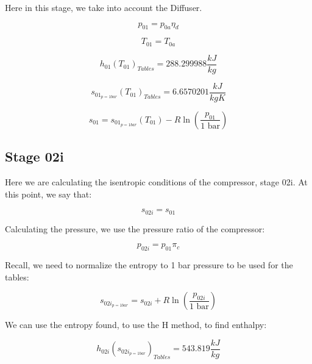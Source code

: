 \documentclass[titlepage]{article}
\begin{document}
    Here in this stage, we take into account the Diffuser. 

    \begin{equation} 
        p_{01} = p_{0a} \eta_{d}
    \end{equation}

    \begin{equation}
        T_{01} = T_{0a} 
    \end{equation}

    \begin{equation}
        h_{01}(T_{01})_{Tables} = 288.299988 \frac{kJ}{kg}
    \end{equation}

    \begin{equation}
        s_{01_{p= 1 bar}}(T_{01})_{Tables} = 6.6570201 \frac{kJ}{kg K}
    \end{equation}

    \begin{equation}
        s_{01} = s_{01_{p=1 bar}}(T_{01}) - R \ln \left( \frac{p_{01}}{1 \text{ bar}} \right)
    \end{equation}

    \subsection{Stage 02i}

    Here we are calculating the isentropic conditions of the compressor, stage 02i. At this point, we say that:

    \begin{equation}
        s_{02i} = s_{01}
    \end{equation}

    Calculating the pressure, we use the pressure ratio of the compressor:

    \begin{equation}
        p_{02i} = p_{01} \pi_{c}
    \end{equation}

    Recall, we need to normalize the entropy to 1 bar pressure to be used for the tables:

    \begin{equation}
        s_{02i_{p=1 bar}} =  s_{02i}+ R \ln \left( \frac{p_{02i}}{1 \text{ bar}} \right)
    \end{equation}

    We can use the entropy found, to use the H method, to find enthalpy:

    \begin{equation}
        h_{02i}(s_{02i_{p=1 bar}})_{Tables} =  543.819 \frac{kJ}{kg}
    \end{equation}
\end{document}
